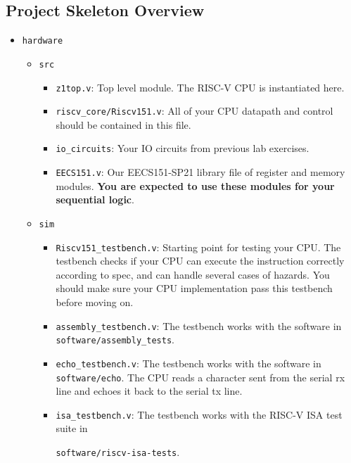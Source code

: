 \documentclass[11pt]{article}
\begin{document}
\subsection{Project Skeleton Overview}
\begin{itemize}
  \item \texttt{hardware}
    \begin{itemize}
      \item \texttt{src}
        \begin{itemize}
          \item \texttt{z1top.v}: Top level module. The RISC-V CPU is instantiated here.
          \item \texttt{riscv\_core/Riscv151.v}: All of your CPU datapath and control should be contained in this file.
          \item \texttt{io\_circuits}: Your IO circuits from previous lab exercises.
          \item \texttt{EECS151.v}: Our EECS151-SP21 library file of register and memory modules. \textbf{You are expected to use these modules for your sequential logic}.
        \end{itemize}
      \item \texttt{sim}
        \begin{itemize}
          \item \verb|Riscv151_testbench.v|: Starting point for testing your CPU. The testbench checks if your CPU can execute the instruction correctly according to spec, and can handle several cases of hazards. You should make sure your CPU implementation pass this testbench before moving on.
          \item \verb|assembly_testbench.v|: The testbench works with the software in \texttt{software/assembly\_tests}.
          \item \verb|echo_testbench.v|: The testbench works with the software in \texttt{software/echo}. The CPU reads a character sent from the serial rx line and echoes it back to the serial tx line.
          \item \verb|isa_testbench.v|: The testbench works with the RISC-V ISA test suite in

\texttt{software/riscv-isa-tests}.


\end{itemize}
\end{itemize}
\end{itemize}
\end{document}
